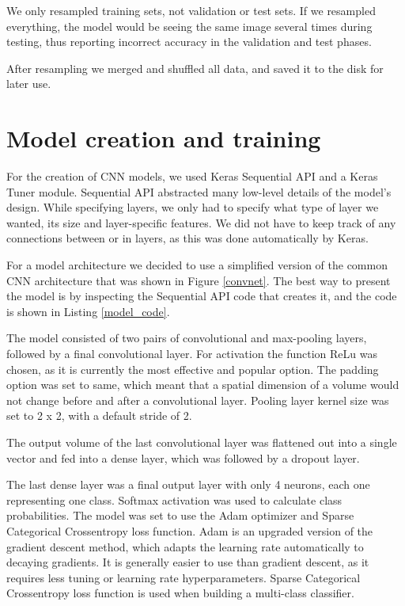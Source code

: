 We only resampled training sets, not validation or test sets.
If we resampled everything, the model would be seeing the same image several times during testing, thus reporting incorrect accuracy in the validation and test phases.

After resampling we merged and shuffled all data, and saved it to the disk for later use.

\newpage
\section{ Model creation and training}\label{cnn_ref}

For the creation of CNN models, we used Keras Sequential API and a Keras Tuner module.
Sequential API abstracted many low-level details of the model's design.
While specifying layers, we only had to specify what type of layer we wanted, its size and layer-specific features. 
We did not have to keep track of any connections between or in layers, as this was done automatically by Keras.

For a model architecture we decided to use a simplified version of the common CNN architecture that was shown in Figure \ref{convnet}.
The best way to present the model is by inspecting the Sequential API code that creates it, and the code is shown in Listing \ref{model_code}.

The model consisted of two pairs of convolutional and max-pooling layers, followed by a final convolutional layer.
For activation the function ReLu was chosen, as it is currently the most effective and popular option\cite{cs231n}\cite{geron}.
The padding option was set to same, which meant that a spatial dimension of a volume would not change before and after a convolutional layer.
Pooling layer kernel size was set to 2 x 2, with a default stride of 2.

The output volume of the last convolutional layer was flattened out into a single vector and fed into a dense layer, which was followed by a dropout layer\footnotemark.


The last dense layer was a final output layer with only 4 neurons, each one representing one class.
Softmax activation was used to calculate class probabilities.
The model was set to use the Adam optimizer and Sparse Categorical Crossentropy loss function.
Adam is an upgraded version of the gradient descent method, which adapts the learning rate automatically to decaying gradients\cite{geron}.
It is generally easier to use than gradient descent, as it requires less tuning or learning rate hyperparameters.
Sparse Categorical Crossentropy loss function is used when building a multi-class classifier.

